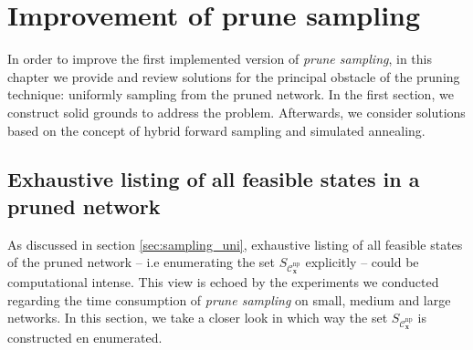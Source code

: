 \documentclass[a4paper, twoside, 11pt]{report}
\newcommand{\bfx}{{\mathbf{x}}}
\newcommand{\C}{{\mathcal C}}
\theoremstyle{plain}
\theoremstyle{definition}
\theoremstyle{remark}
\newcommand{\ps}{\textit{prune sampling }}
\begin{document}
%
%
\chapter{Improvement of prune sampling}\label{ch:5}
In order to improve the first implemented version of \textit{prune sampling}, in this chapter we provide and review solutions for the principal obstacle of the {pruning} technique: uniformly sampling from the pruned network. In the first section, we construct solid grounds to address the problem. Afterwards, we consider solutions based on the concept of hybrid forward sampling and simulated annealing.

\section{Exhaustive listing of all feasible states in a pruned network}
As discussed in section \ref{sec:sampling_uni}, exhaustive listing of all feasible states of the pruned network -- i.e enumerating the set $S_{\C_\bfx^{\text{np}}}$ explicitly -- could be computational intense. This view is echoed by the experiments we conducted regarding the time consumption of \ps on small, medium and large networks. In this section, we take a closer look in which way the set $S_{\C_\bfx^{\text{np}}}$ is constructed en enumerated.\\
\end{document}
